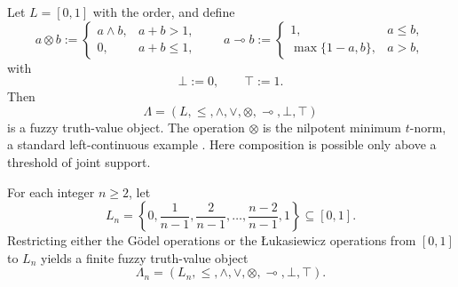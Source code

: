 \begin{example}
\label{ex:nilpotent-minimum-quantale}
    Let \(L=[0,1]\) with the order, and define
    \[
        a\otimes b:=
        \begin{cases}
            a\wedge b,&a+b>1,\\
            0,&a+b\leq 1,
        \end{cases}
        \qquad
        a\multimap b:=
        \begin{cases}
            1,&a\leq b,\\
            \max\{1-a,b\},&a>b,
        \end{cases}
    \]
    with
    \[
        \bot:=0,
        \qquad
        \top:=1.
    \]
    Then
    \[
        \Lambda=(L,\leq,\wedge,\vee,\otimes,\multimap,\bot,\top)
    \]
    is a fuzzy truth-value object. The operation \(\otimes\) is the nilpotent minimum \(t\)-norm, a standard left-continuous example \cite[Example~2.4, footnote~5]{stubbe-2014-quantaloid-enriched}. Here composition is possible only above a threshold of joint support.
\end{example}

\begin{example}
\label{ex:finite-many-valued-chains}
    For each integer \(n\geq 2\), let
    \[
        L_n=
        \left\{
        0,\frac{1}{n-1},\frac{2}{n-1},\dots,\frac{n-2}{n-1},1
        \right\}
        \subseteq [0,1].
    \]
    Restricting either the G\"odel operations or the {\L}ukasiewicz operations from \([0,1]\) to \(L_n\) yields a finite fuzzy truth-value object
    \[
        \Lambda_n=(L_n,\leq,\wedge,\vee,\otimes,\multimap,\bot,\top).
    \]
\end{example}

